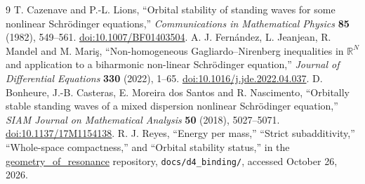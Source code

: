 \documentclass[11pt]{article}
\begin{document}
\begin{thebibliography}{9}
T. Cazenave and P.-L. Lions, ``Orbital stability of standing waves for some
nonlinear Schr\"odinger equations,'' \emph{Communications in Mathematical
Physics} \textbf{85} (1982), 549--561.
\href{https://doi.org/10.1007/BF01403504}{doi:10.1007/BF01403504}.
A. J. Fern\'andez, L. Jeanjean, R. Mandel and M. Mari\c{s},
``Non-homogeneous Gagliardo--Nirenberg inequalities in
\(\mathbb R^N\) and application to a biharmonic non-linear Schr\"odinger equation,''
\emph{Journal of Differential Equations} \textbf{330} (2022), 1--65.
\href{https://doi.org/10.1016/j.jde.2022.04.037}{doi:10.1016/j.jde.2022.04.037}.
D. Bonheure, J.-B. Casteras, E. Moreira dos Santos and R. Nascimento,
``Orbitally stable standing waves of a mixed dispersion nonlinear Schr\"odinger equation,''
\emph{SIAM Journal on Mathematical Analysis} \textbf{50} (2018), 5027--5071.
\href{https://doi.org/10.1137/17M1154138}{doi:10.1137/17M1154138}.
R. J. Reyes, ``Energy per mass,'' ``Strict subadditivity,'' ``Whole-space
compactness,'' and ``Orbital stability status,'' in the
\href{https://github.com/rickyjreyes/geometry_of_resonance/tree/main/docs/d4_binding}{geometry\_of\_resonance}
repository, \texttt{docs/d4\_binding/}, accessed October 26, 2026.
\end{thebibliography}
\end{document}
